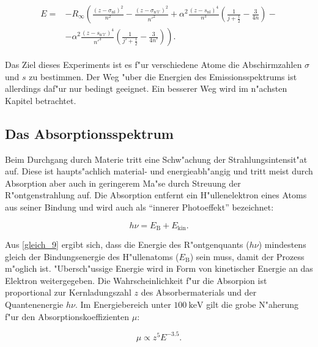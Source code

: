 		\begin{align}
		\begin{split}
			E = & -R_\infty \left( \frac{(z - \sigma_\mathrm{nl})^2}{n^2} - \frac{(z - \sigma_\mathrm{n'l'})^2}{n'^2} +  \alpha^2 \frac{(z - s_\mathrm{nl})^4}{n^3} \left( \frac{1}{j + \frac{1}{2}} - \frac{3}{4n} \right) - \right. \\& \left. - \alpha^2 \frac{(z - s_\mathrm{n'l'})^4}{n'^3} \left( \frac{1}{j' + \frac{1}{2}} - \frac{3}{4n'} \right) \right) . \label{gleich_8}
		\end{split}
		\end{align}

		Das Ziel dieses Experiments ist es f"ur verschiedene Atome die Abschirmzahlen $\sigma$ und $s$ zu bestimmen.
		Der Weg "uber die Energien des Emissionsspektrums ist allerdings daf"ur nur bedingt geeignet.
		Ein besserer Weg wird im n"achsten Kapitel betrachtet.

	\subsection{Das Absorptionsspektrum}
	\label{sub:das_absorptionsspektrum}
	
		Beim Durchgang durch Materie tritt eine Schw"achung der Strahlungsintensit"at auf.
		Diese ist haupts"achlich material- und energieabh"angig und tritt meist durch Absorption aber auch in geringerem Ma"se durch Streuung der R"ontgenstrahlung auf. 
		Die Absorption entfernt ein H"ullenelektron eines Atoms aus seiner Bindung und wird auch als "`innerer Photoeffekt"' bezeichnet:

		\begin{equation}
			h\nu = E_\mathrm{B} + E_\mathrm{kin}. \label{gleich_9}
		\end{equation}

		Aus \eqref{gleich_9} ergibt sich, dass die Energie des R"ontgenquants ($h\nu$) mindestens gleich der Bin\-dungs\-en\-er\-gie des H"ullenatoms ($E_\mathrm{B}$) sein muss, damit der Prozess m"oglich ist.
		"Ubersch"ussige Energie wird in Form von kinetischer Energie an das Elektron weitergegeben.
		Die Wahr\-schein\-lich\-keit f"ur die Absorpion ist proportional zur Kernladungszahl $z$ des Absorbermaterials und der Quantenenergie $h\nu$.
		Im Energiebereich unter $\SI{100}{\kilo\electronvolt}$ gilt die grobe N"aherung f"ur den Absorptionskoeffizienten $\mu$:
		
		\begin{equation}
			\mu \propto z^5 E^{-3.5}. \label{gleich_10}
		\end{equation}

